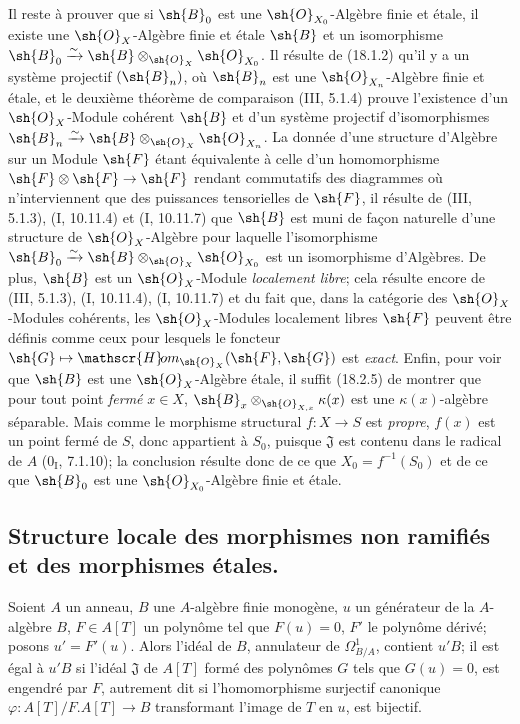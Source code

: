 Il reste à prouver que si $\sh{B}_0$ est une $\sh{O}_{X_0}$-Algèbre finie et étale, il existe une $\sh{O}_X$-Algèbre finie et étale $\sh{B}$ et un isomorphisme $\sh{B}_0\xrightarrow{\sim}\sh{B}\otimes_{\sh{O}_X}\sh{O}_{X_0}$. Il résulte de (18.1.2) qu'il y a un système projectif $(\sh{B}_n)$, où $\sh{B}_n$ est une $\sh{O}_{X_n}$-Algèbre finie et étale, et le deuxième théorème de comparaison (III, 5.1.4) prouve l'existence d'un $\sh{O}_X$-Module cohérent $\sh{B}$ et d'un système projectif d'isomorphismes $\sh{B}_n\xrightarrow{\sim}\sh{B}\otimes_{\sh{O}_X}\sh{O}_{X_n}$. La donnée d'une structure d'Algèbre sur un Module $\sh{F}$ étant équivalente à celle d'un homomorphisme $\sh{F}\otimes\sh{F}\to\sh{F}$ rendant commutatifs des diagrammes où n'interviennent que des puissances tensorielles de $\sh{F}$, il résulte de (III, 5.1.3), (I, 10.11.4) et (I, 10.11.7) que $\sh{B}$ est muni de façon naturelle d'une structure de $\sh{O}_X$-Algèbre pour laquelle l'isomorphisme $\sh{B}_0\xrightarrow{\sim}\sh{B}\otimes_{\sh{O}_X}\sh{O}_{X_0}$ est un isomorphisme d'Algèbres. De plus, $\sh{B}$ est un $\sh{O}_X$-Module \emph{localement libre}; cela résulte encore de (III, 5.1.3), (I, 10.11.4), (I, 10.11.7) et du fait que, dans la catégorie des $\sh{O}_X$-Modules cohérents, les $\sh{O}_X$-Modules localement libres $\sh{F}$ peuvent être définis comme ceux pour lesquels le foncteur $\sh{G}\mapsto\mathscr{H}\!om_{\sh{O}_X}(\sh{F},\sh{G})$ est \emph{exact}. Enfin, pour voir que $\sh{B}$ est une $\sh{O}_X$-Algèbre étale, il suffit (18.2.5) de montrer que pour tout point \emph{fermé} $x\in X$, $\sh{B}_x\otimes_{\sh{O}_{X,x}}\kappa(x)$ est une $\kappa(x)$-algèbre séparable. Mais comme le morphisme structural $f:X\to S$ est \emph{propre}, $f(x)$ est un point fermé de $S$, donc appartient à $S_0$, puisque $\mathfrak J$ est contenu dans le radical de $A$ ($0_{\mathrm I}$, 7.1.10); la conclusion résulte donc de ce que $X_0=f^{-1}(S_0)$ et de ce que $\sh{B}_0$ est une $\sh{O}_{X_0}$-Algèbre finie et étale.

\subsection{Structure locale des morphismes non ramifiés et des morphismes étales.}
\label{subsection:IV.18.4}


\begin{lemma}[18.4.1]
\label{IV.18.4.1}
Soient $A$ un anneau, $B$ une $A$-algèbre finie monogène, $u$ un générateur de la $A$-algèbre $B$, $F\in A[T]$ un polynôme tel que $F(u)=0$, $F'$ le polynôme dérivé; posons $u'=F'(u)$. Alors l'idéal de $B$, annulateur de $\Omega^1_{B/A}$, contient $u'B$; il est égal à $u'B$ si l'idéal $\mathfrak J$ de $A[T]$ formé des polynômes $G$ tels que $G(u)=0$, est engendré par $F$, autrement dit si l'homomorphisme surjectif canonique $\varphi:A[T]/F.A[T]\to B$ transformant l'image de $T$ en $u$, est bijectif.
\end{lemma}

